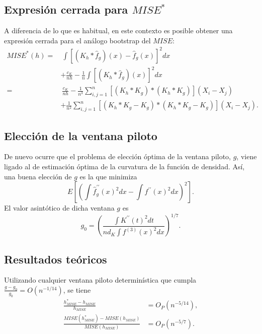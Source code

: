 \documentclass[]{book}
\theoremstyle{definition}
\theoremstyle{definition}
\theoremstyle{definition}
\theoremstyle{remark}
\begin{document}
\subsection{\texorpdfstring{Expresión cerrada para
\(MISE^{\ast}\)}{Expresión cerrada para MISE\^{}\{\textbackslash{}ast\}}}\label{expresion-cerrada-para-miseast}

A diferencia de lo que es habitual, en este contexto es posible obtener
una expresión cerrada para el análogo bootstrap del \(MISE\):
\[\begin{aligned}
MISE^{\ast}\left( h \right) =&\ \int \left[ \left( K_{h}\ast 
\hat{f}_{g} \right) \left( x \right) -\hat{f}_{g}\left( x \right) \right]^2dx \\
&+\frac{c_{K}}{nh}-\frac{1}{n}\int \left[ \left( K_{h}\ast 
\hat{f}_{g} \right) \left( x \right) \right]^2dx \\
=&\ \frac{c_{K}}{nh}-\frac{1}{n^{3}}\sum_{i,j=1}^{n}\left[ \left( K_{h}\ast
K_{g} \right) \ast \left( K_{h}\ast K_{g} \right) \right] \left(
X_i-X_j \right) \\
&+\frac{1}{n^2}\sum_{i,j=1}^{n}\left[ \left( K_{h}\ast K_{g}-K_{g} \right)
\ast \left( K_{h}\ast K_{g}-K_{g} \right) \right] \left( X_i-X_j \right).\end{aligned}\]

\subsection{Elección de la ventana
piloto}\label{eleccion-de-la-ventana-piloto}

De nuevo ocurre que el problema de elección óptima de la ventana piloto,
\(g\), viene ligado al de estimación óptima de la curvatura de la
función de densidad. Así, una buena elección de \(g\) es la que
minimiza\[E\left[ \left( \int \hat{f}_{g}^{\prime \prime }\left( x \right)^2dx-\int
f^{\prime \prime }\left( x \right)^2dx \right)^2\right] .\]El valor
asintótico de dicha ventana \(g\)
es\[g_{0}=\left( \frac{\int K^{\prime \prime }\left( t \right)^2dt}{nd_{K}\int
f^{\left( 3 \right)}\left( x \right)^2dx} \right)^{1/7}.\]

\subsection{Resultados teóricos}\label{resultados-teoricos}

Utilizando cualquier ventana piloto determinística que cumpla
\(\frac{g-g_{0}}{g_{0}}=O\left( n^{-1/14} \right)\), se tiene
\[\begin{aligned}
\frac{h_{MISE}^{\ast}-h_{MISE}}{h_{MISE}} &= O_{P}\left( n^{-5/14} \right),\\
\frac{MISE\left( h_{MISE}^{\ast} \right) -MISE\left( h_{MISE} \right)}{
MISE\left( h_{MISE} \right)} &= O_{P}\left( n^{-5/7} \right).
\end{aligned}\]
\end{document}
